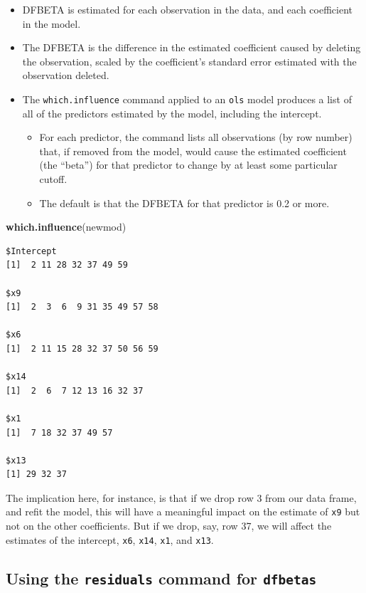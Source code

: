 \documentclass[]{book}
\newenvironment{Shaded}{\begin{snugshade}}{\end{snugshade}}
\newcommand{\KeywordTok}[1]{\textcolor[rgb]{0.13,0.29,0.53}{\textbf{#1}}}
\newcommand{\NormalTok}[1]{#1}
\providecommand{\tightlist}{%
  \setlength{\itemsep}{0pt}\setlength{\parskip}{0pt}}
\theoremstyle{definition}
\theoremstyle{definition}
\theoremstyle{definition}
\theoremstyle{remark}
\begin{document}
\begin{itemize}
\tightlist
\item
  DFBETA is estimated for each observation in the data, and each
  coefficient in the model.
\item
  The DFBETA is the difference in the estimated coefficient caused by
  deleting the observation, scaled by the coefficient's standard error
  estimated with the observation deleted.
\item
  The \texttt{which.influence} command applied to an \texttt{ols} model
  produces a list of all of the predictors estimated by the model,
  including the intercept.

  \begin{itemize}
  \tightlist
  \item
    For each predictor, the command lists all observations (by row
    number) that, if removed from the model, would cause the estimated
    coefficient (the ``beta'') for that predictor to change by at least
    some particular cutoff.
  \item
    The default is that the DFBETA for that predictor is 0.2 or more.
  \end{itemize}
\end{itemize}

\begin{Shaded}
\begin{Highlighting}[]
\KeywordTok{which.influence}\NormalTok{(newmod)}
\end{Highlighting}
\end{Shaded}

\begin{verbatim}
$Intercept
[1]  2 11 28 32 37 49 59

$x9
[1]  2  3  6  9 31 35 49 57 58

$x6
[1]  2 11 15 28 32 37 50 56 59

$x14
[1]  2  6  7 12 13 16 32 37

$x1
[1]  7 18 32 37 49 57

$x13
[1] 29 32 37
\end{verbatim}

The implication here, for instance, is that if we drop row 3 from our
data frame, and refit the model, this will have a meaningful impact on
the estimate of \texttt{x9} but not on the other coefficients. But if we
drop, say, row 37, we will affect the estimates of the intercept,
\texttt{x6}, \texttt{x14}, \texttt{x1}, and \texttt{x13}.

\subsection{\texorpdfstring{Using the \texttt{residuals} command for
\texttt{dfbetas}}{Using the residuals command for dfbetas}}\label{using-the-residuals-command-for-dfbetas}
\end{document}
